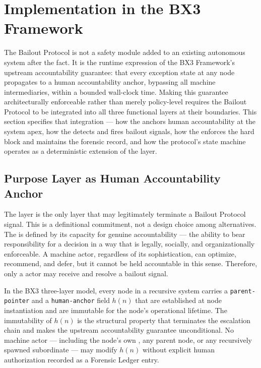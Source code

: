 \section{Implementation in the BX3 Framework}
\label{sec:implementation}

The Bailout Protocol is not a safety module added to an existing autonomous system after the fact. It is the runtime expression of the BX3 Framework's upstream accountability guarantee: that every exception state at any node propagates to a human accountability anchor, bypassing all machine intermediaries, within a bounded wall-clock time. Making this guarantee architecturally enforceable rather than merely policy-level requires the Bailout Protocol to be integrated into all three functional layers at their boundaries. This section specifies that integration — how the \purpose{} anchors human accountability at the system apex, how the \bounds{} detects and fires bailout signals, how the \fact{} enforces the hard block and maintains the forensic record, and how the protocol's state machine operates as a deterministic extension of the \fact{} layer.

\subsection{Purpose Layer as Human Accountability Anchor}
\label{sec:purpose-anchor}

The \purpose{} layer is the only layer that may legitimately terminate a Bailout Protocol signal. This is a definitional commitment, not a design choice among alternatives. The \purpose{} is defined by its capacity for genuine accountability — the ability to bear responsibility for a decision in a way that is legally, socially, and organizationally enforceable. A machine actor, regardless of its sophistication, can optimize, recommend, and defer, but it cannot be held accountable in this sense. Therefore, only a \purpose{} actor may receive and resolve a bailout signal.

In the BX3 three-layer model, every node in a recursive system carries a \texttt{parent-pointer} and a \texttt{human-anchor} field $h(n)$ that are established at node instantiation and are immutable for the node's operational lifetime. The immutability of $h(n)$ is the structural property that terminates the escalation chain and makes the upstream accountability guarantee unconditional. No machine actor — including the node's own \bounds{}, any parent node, or any recursively spawned subordinate — may modify $h(n)$ without explicit human authorization recorded as a Forensic Ledger entry.

